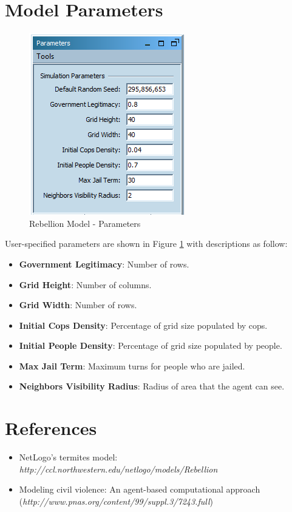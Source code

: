 \documentclass[11pt]{amsart}
\begin{document}
\section{Model Parameters} 

\begin{figure}[h!]
\centering
\vspace{.2in}
\centerline {
\includegraphics{Images/rebellion_param.png}}
\caption{Rebellion Model - Parameters}
\label{fig:param}
\end{figure}

User-specified parameters are shown in Figure \ref{fig:param} with descriptions as follow:

\begin{itemize}
\item \textbf{Government Legitimacy}:  Number of rows.
\item \textbf{Grid Height}:  Number of columns.
\item \textbf{Grid Width}:  Number of rows.
\item \textbf{Initial Cops Density}:  Percentage of grid size populated by cops.
\item \textbf{Initial People Density}:  Percentage of grid size populated by people.
\item \textbf{Max Jail Term}:  Maximum turns for people who are jailed.
\item \textbf{Neighbors Visibility Radius}:  Radius of area that the agent can see.
\end{itemize}
\vspace{.2in}


\section {References}

\begin{itemize}
\item NetLogo's termites model: \emph{http://ccl.northwestern.edu/netlogo/models/Rebellion}
\item Modeling civil violence: An agent-based computational approach (\emph{http://www.pnas.org/content/99/suppl.3/7243.full})
\end{itemize}
\end{document}
